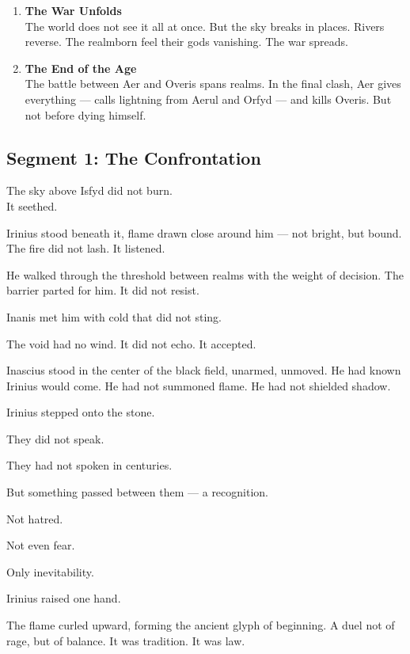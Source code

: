\documentclass[9pt]{article}
\begin{document}
\begin{enumerate}
    \vspace{1em}
    \item \textbf{The War Unfolds} \\
    The world does not see it all at once. But the sky breaks in places. Rivers reverse. The realmborn feel their gods vanishing. The war spreads.

    \vspace{1em}
    \item \textbf{The End of the Age} \\
    The battle between Aer and Overis spans realms. In the final clash, Aer gives everything — calls lightning from Aerul and Orfyd — and kills Overis. But not before dying himself.

\end{enumerate}


\newpage

\subsection*{Segment 1: The Confrontation}

The sky above Isfyd did not burn.\\
It seethed.

Irinius stood beneath it, flame drawn close around him — not bright, but bound. The fire did not lash. It listened.

He walked through the threshold between realms with the weight of decision. The barrier parted for him. It did not resist.

Inanis met him with cold that did not sting.

The void had no wind. It did not echo. It accepted.

Inascius stood in the center of the black field, unarmed, unmoved. He had known Irinius would come. He had not summoned flame. He had not shielded shadow.

Irinius stepped onto the stone.

They did not speak.

They had not spoken in centuries.

But something passed between them — a recognition.

Not hatred.

Not even fear.

Only inevitability.

Irinius raised one hand.

The flame curled upward, forming the ancient glyph of beginning. A duel not of rage, but of balance. It was tradition. It was law.
\end{document}
